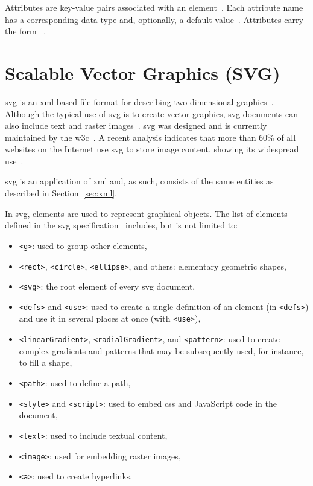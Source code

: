 Attributes are key-value pairs associated with an element~\cite[Sec.~3.3]{xml11}. Each attribute name has a corresponding data type and, optionally, a default value~\cite[Sec.~3.3]{xml11}. Attributes carry the form ~\cite[Sec.~3.3]{xml11}.

\section{Scalable Vector Graphics (SVG)}\label{theo:svg}

\gls{svg} is an \gls{xml}-based file format for describing two-dimensional graphics~\cite[Sec.~1.1]{svg11}. Although the typical use of \gls{svg} is to create vector graphics, \gls{svg} documents can also include text and raster images~\cite[Sec.~2]{svg11}. \gls{svg} was designed and is currently maintained by the \gls{w3c}~\cite{svg11, svg2, svg2-draft}. A recent analysis indicates that more than 60\% of all websites on the Internet use \gls{svg} to store image content, showing its widespread use~\cite{imageformats}.

\gls{svg} is an application of \gls{xml} and, as such, consists of the same entities as described in Section~\ref{sec:xml}.

In \gls{svg}, elements are used to represent graphical objects. The list of elements defined in the \gls{svg} specification~\cite{svg11} includes, but is not limited to:
\begin{itemize}
    \item \texttt{<g>}: used to group other elements,
    \item \texttt{<rect>}, \texttt{<circle>}, \texttt{<ellipse>}, and others: elementary geometric shapes,
    \item \texttt{<svg>}: the root element of every \gls{svg} document,
    \item \texttt{<defs>} and \texttt{<use>}: used to create a single definition of an element (in \texttt{<defs>}) and use it in several places at once (with \texttt{<use>}),
    \item \texttt{<linearGradient>}, \texttt{<radialGradient>}, and \texttt{<pattern>}: used to create complex gradients and patterns that may be subsequently used, for instance, to fill a shape,
    \item \texttt{<path>}: used to define a path,
    \item \texttt{<style>} and \texttt{<script>}: used to embed \gls{css} and JavaScript code in the document,
    \item \texttt{<text>}: used to include textual content,
    \item \texttt{<image>}: used for embedding raster images,
    \item \texttt{<a>}: used to create hyperlinks.
\end{itemize}

